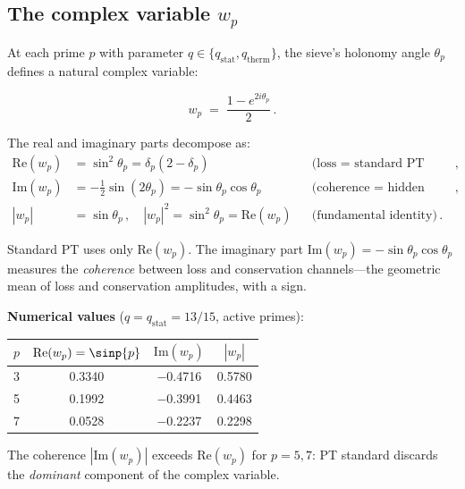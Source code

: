\documentclass[12pt,a4paper]{article}
\begin{document}
\subsection{The complex variable \texorpdfstring{$w_p$}{wp}}
\label{sec:cx_variable}

At each prime $p$ with parameter $q \in \{q_{\mathrm{stat}}, q_{\mathrm{therm}}\}$,
the sieve's holonomy angle $\theta_p$ defines a natural complex variable:

\begin{equation}
  w_p \;=\; \frac{1 - e^{2i\theta_p}}{2}\,.
  \label{eq:wp_def}
\end{equation}

The real and imaginary parts decompose as:
\begin{align}
  \mathrm{Re}(w_p) &= \sin^2\theta_p = \delta_p(2-\delta_p)
    && \text{(loss = standard PT observable)}\,, \label{eq:wp_re}\\
  \mathrm{Im}(w_p) &= -\tfrac{1}{2}\sin(2\theta_p) = -\sin\theta_p\cos\theta_p
    && \text{(coherence = hidden observable)}\,, \label{eq:wp_im}\\
  |w_p| &= \sin\theta_p\,,\quad
  |w_p|^2 = \sin^2\theta_p = \mathrm{Re}(w_p)
    && \text{(fundamental identity)}\,. \label{eq:wp_mod}
\end{align}

Standard PT uses only $\mathrm{Re}(w_p)$. The imaginary part
$\mathrm{Im}(w_p) = -\sin\theta_p\cos\theta_p$ measures the
\emph{coherence} between loss and conservation channels---the
geometric mean of loss and conservation amplitudes, with a sign.

\medskip
\noindent\textbf{Numerical values} ($q = q_{\mathrm{stat}} = 13/15$,
active primes):
\begin{center}
\begin{tabular}{cccc}
\toprule
$p$ & $\mathrm{Re}(w_p) = \sinp{p}$ & $\mathrm{Im}(w_p)$ & $|w_p|$ \\
\midrule
3 & 0.3340 & $-$0.4716 & 0.5780 \\
5 & 0.1992 & $-$0.3991 & 0.4463 \\
7 & 0.0528 & $-$0.2237 & 0.2298 \\
\bottomrule
\end{tabular}
\end{center}

The coherence $|\mathrm{Im}(w_p)|$ exceeds $\mathrm{Re}(w_p)$ for
$p = 5, 7$: PT standard discards the \emph{dominant} component of the
complex variable.
\end{document}
